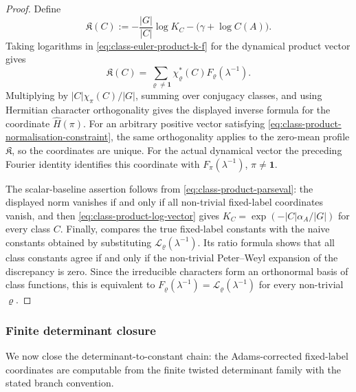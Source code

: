 \documentclass[11pt,a4paper]{amsart}
\theoremstyle{plain}
\theoremstyle{definition}
\theoremstyle{remark}
\begin{document}
\begin{proof}
  Define
  \[
    \mathfrak K(C):=
    -\frac{|G|}{|C|}\log K_C-\bigl(\gamma+\log C(A)\bigr).
  \]
  Taking logarithms in \eqref{eq:class-euler-product-k-f} for the dynamical
  product vector gives
  \[
    \mathfrak K(C)=
    \sum_{\varrho\ne\mathbf1}
      \chi_\varrho^\ast(C)F_\varrho(\lambda^{-1}).
  \]
  Multiplying by \(|C|\chi_\pi(C)/|G|\), summing over conjugacy classes,
  and using Hermitian character orthogonality gives the displayed inverse
  formula for the coordinate \(\widehat H(\pi)\).  For an arbitrary positive
  vector satisfying \eqref{eq:class-product-normalisation-constraint}, the
  same orthogonality applies to the zero-mean profile \(\mathfrak K\), so
  the coordinates are unique.  For the actual dynamical vector the preceding
  Fourier identity identifies this coordinate with
  \(F_\pi(\lambda^{-1})\), \(\pi\ne\mathbf1\).

  The scalar-baseline assertion follows from
  \eqref{eq:class-product-parseval}: the displayed norm vanishes if and
  only if all non-trivial fixed-label coordinates vanish, and then
  \eqref{eq:class-product-log-vector} gives
  \(K_C=\exp(-|C|\alpha_A/|G|)\) for every class \(C\).  Finally,
   compares the true fixed-label
  constants with the naive constants obtained by substituting
  \(\mathcal L_\varrho(\lambda^{-1})\).  Its ratio formula shows that all
  class constants agree if and only if the non-trivial Peter--Weyl expansion
  of the discrepancy is zero.  Since the irreducible characters form an
  orthonormal basis of class functions, this is equivalent to
  \(F_\varrho(\lambda^{-1})=\mathcal L_\varrho(\lambda^{-1})\) for every
  non-trivial \(\varrho\).
\end{proof}
\subsubsection{Finite determinant closure}
\label{subsubsec:finite-determinant-closure-classical-comparison}

We now close the determinant-to-constant chain: the Adams-corrected
fixed-label coordinates are computable from the finite twisted determinant
family with the stated branch convention.
\end{document}
